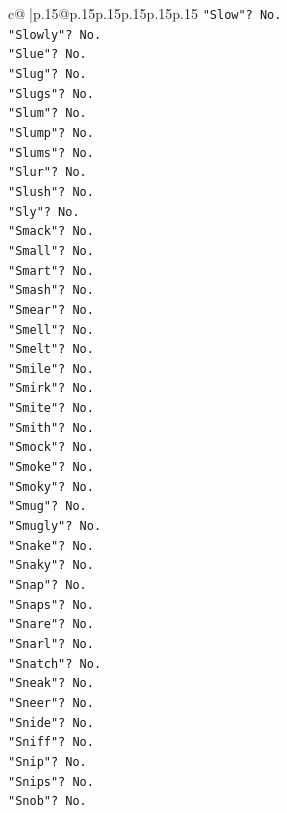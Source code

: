 \documentclass{article}
\begin{document}
{\begin{supertabular}{c@{$\;$}|p{.15\linewidth}@{}p{.15\linewidth}p{.15\linewidth}p{.15\linewidth}p{.15\linewidth}p{.15\linewidth}}
{{{\texttt{"Slow"? No.} \\
\texttt{"Slowly"? No.} \\
\texttt{"Slue"? No.} \\
\texttt{"Slug"? No.} \\
\texttt{"Slugs"? No.} \\
\texttt{"Slum"? No.} \\
\texttt{"Slump"? No.} \\
\texttt{"Slums"? No.} \\
\texttt{"Slur"? No.} \\
\texttt{"Slush"? No.} \\
\texttt{"Sly"? No.} \\
\texttt{"Smack"? No.} \\
\texttt{"Small"? No.} \\
\texttt{"Smart"? No.} \\
\texttt{"Smash"? No.} \\
\texttt{"Smear"? No.} \\
\texttt{"Smell"? No.} \\
\texttt{"Smelt"? No.} \\
\texttt{"Smile"? No.} \\
\texttt{"Smirk"? No.} \\
\texttt{"Smite"? No.} \\
\texttt{"Smith"? No.} \\
\texttt{"Smock"? No.} \\
\texttt{"Smoke"? No.} \\
\texttt{"Smoky"? No.} \\
\texttt{"Smug"? No.} \\
\texttt{"Smugly"? No.} \\
\texttt{"Snake"? No.} \\
\texttt{"Snaky"? No.} \\
\texttt{"Snap"? No.} \\
\texttt{"Snaps"? No.} \\
\texttt{"Snare"? No.} \\
\texttt{"Snarl"? No.} \\
\texttt{"Snatch"? No.} \\
\texttt{"Sneak"? No.} \\
\texttt{"Sneer"? No.} \\
\texttt{"Snide"? No.} \\
\texttt{"Sniff"? No.} \\
\texttt{"Snip"? No.} \\
\texttt{"Snips"? No.} \\
\texttt{"Snob"? No.} \\
}}}
\end{supertabular}}
\end{document}
